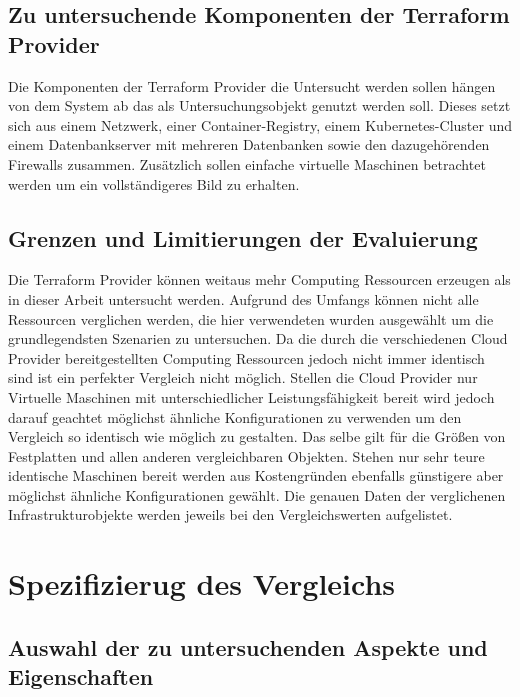 \begin{spacing}{1.2}
\subsection{Zu untersuchende Komponenten der Terraform Provider}

Die Komponenten der Terraform Provider die Untersucht werden sollen
hängen von dem System ab das als Untersuchungsobjekt genutzt werden soll.
Dieses setzt sich aus einem Netzwerk, einer Container-Registry, einem
Kubernetes-Cluster und einem Datenbankserver mit mehreren Datenbanken
sowie den dazugehörenden Firewalls zusammen. Zusätzlich sollen
einfache virtuelle Maschinen betrachtet werden um ein vollständigeres Bild
zu erhalten.

\subsection{Grenzen und Limitierungen der Evaluierung}

Die Terraform Provider können weitaus mehr Computing Ressourcen erzeugen
als in dieser Arbeit untersucht werden. Aufgrund des Umfangs können
nicht alle Ressourcen verglichen werden, die hier verwendeten wurden
ausgewählt um die grundlegendsten Szenarien zu untersuchen. Da die durch
die verschiedenen Cloud Provider bereitgestellten Computing Ressourcen
jedoch
nicht immer identisch sind ist ein perfekter Vergleich nicht möglich.
Stellen die Cloud Provider nur Virtuelle Maschinen mit unterschiedlicher
Leistungsfähigkeit bereit wird jedoch darauf geachtet möglichst ähnliche
Konfigurationen zu verwenden um den Vergleich so identisch wie möglich zu
gestalten. Das selbe gilt für die Größen von Festplatten und allen anderen
vergleichbaren Objekten. Stehen nur sehr teure identische Maschinen bereit
werden aus Kostengründen ebenfalls günstigere aber möglichst ähnliche
Konfigurationen gewählt. Die genauen Daten der verglichenen
Infrastrukturobjekte werden jeweils bei den Vergleichswerten aufgelistet.

\section{Spezifizierug des Vergleichs}

\subsection{Auswahl der zu untersuchenden Aspekte und Eigenschaften}


\end{spacing}
